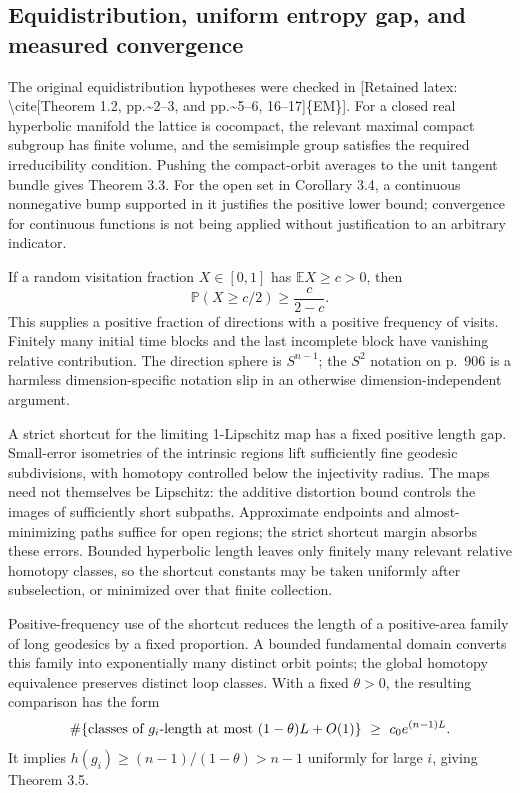 \documentclass[10pt]{article}
\begin{document}
\subsection*{Equidistribution, uniform entropy gap, and measured convergence}
The original equidistribution hypotheses were checked in [Retained latex: \textbackslash{}cite[Theorem 1.2, pp.\textasciitilde{}2--3, and pp.\textasciitilde{}5--6, 16--17]\{EM\}]. For a closed real hyperbolic manifold the lattice is cocompact, the relevant maximal compact subgroup has finite volume, and the semisimple group satisfies the required irreducibility condition. Pushing the compact-orbit averages to the unit tangent bundle gives Theorem 3.3. For the open set in Corollary 3.4, a continuous nonnegative bump supported in it justifies the positive lower bound; convergence for continuous functions is not being applied without justification to an arbitrary indicator.\par
If a random visitation fraction \(X\in[0,1]\) has \(\mathbb E X\geq c>0\), then \[\mathbb P(X\geq c/2)\geq\frac{c}{2-c}.\] This supplies a positive fraction of directions with a positive frequency of visits. Finitely many initial time blocks and the last incomplete block have vanishing relative contribution. The direction sphere is \(S^{n-1}\); the \(S^2\) notation on p. 906 is a harmless dimension-specific notation slip in an otherwise dimension-independent argument.\par
A strict shortcut for the limiting 1-Lipschitz map has a fixed positive length gap. Small-error isometries of the intrinsic regions lift sufficiently fine geodesic subdivisions, with homotopy controlled below the injectivity radius. The maps need not themselves be Lipschitz: the additive distortion bound controls the images of sufficiently short subpaths. Approximate endpoints and almost-minimizing paths suffice for open regions; the strict shortcut margin absorbs these errors. Bounded hyperbolic length leaves only finitely many relevant relative homotopy classes, so the shortcut constants may be taken uniformly after subselection, or minimized over that finite collection.\par
Positive-frequency use of the shortcut reduces the length of a positive-area family of long geodesics by a fixed proportion. A bounded fundamental domain converts this family into exponentially many distinct orbit points; the global homotopy equivalence preserves distinct loop classes. With a fixed \(\theta>0\), the resulting comparison has the form \[\#\{\hbox{classes of }g_i\hbox{-length at most }(1-\theta)L+O(1)\}
 \ \geq\ c_0 e^{(n-1)L}.\] It implies \(h(g_i)\geq(n-1)/(1-\theta)>n-1\) uniformly for large \(i\), giving Theorem 3.5.\par
\end{document}
